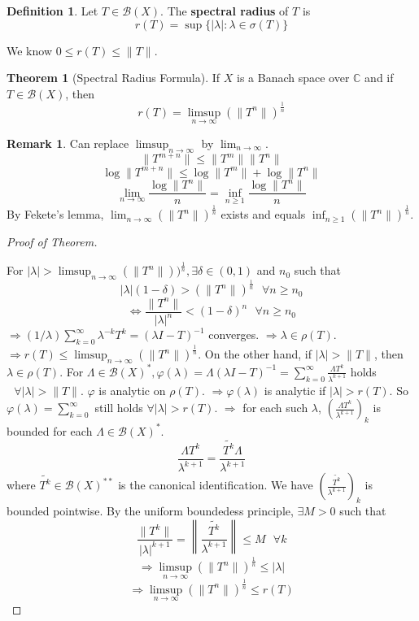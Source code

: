 \documentclass{article}
\theoremstyle{definition}
\newtheorem{thm}{Theorem}
\newtheorem{dfn}{Definition}
\newtheorem{rem}{Remark}
\newenvironment{proofs}[1][\proofname]{%
  \begin{proof}[#1]$ $\par\nobreak\ignorespaces
}{%
  \end{proof}
}
\newcommand{\sfa}{\text{  } \forall}
\begin{document}
\begin{dfn}
	Let $T \in \mathcal{B}(X)$.
	The \textbf{spectral radius} of $T$ is 
	\[
		r(T) = \sup \{|\lambda|: \lambda \in \sigma(T)\}
	\]
\end{dfn}

We know $0 \leq r(T) \leq \|T\|$.

\begin{thm}[Spectral Radius Formula]
	If $X$ is a Banach space over $\mathbb{C}$ and if $T \in \mathcal{B}(X)$, then
	\[
		r(T) = \limsup_{n \to \infty} (\|T^n\|)^{\frac{1}{n}}
	\]
\end{thm}

\begin{rem}
	Can replace $\limsup_{n \to \infty}$ by $\lim_{n \to \infty}$.
	\[
		\|T^{m + n} \| \leq \| T^m\|\|T^n\|
	\]
	\[
		\log \|T^{m + n}\| \leq \log \|T^m\| + \log \|T^n\|
	\]
	\[
		\lim_{n \to \infty} \frac{\log \|T^n\|}{n} = \inf_{n \geq 1} \frac{\log \|T^n\|}{n}
	\]
	By Fekete's lemma, $\lim_{n \to \infty}(\|T^n\|)^{\frac{1}{n}}$ exists and equals $\inf_{n \geq 1}(\|T^n\|)^{\frac{1}{n}}$.
\end{rem}

\begin{proofs}[Proof of Theorem]
	For $|\lambda| > \limsup_{n \to \infty} (\|T^n\|))^\frac{1}{n}, \exists \delta \in (0, 1)$ and $n_0$ such that
	\[
		|\lambda|(1 - \delta) > (\|T^n\|)^{\frac{1}{n}} \sfa n \geq n_0
	\]
	\[
		\Leftrightarrow \frac{\|T^n\|}{|\lambda|^n} < (1 - \delta)^n \sfa n \geq n_0
	\]
	$\Rightarrow (1/\lambda) \sum_{k = 0}^\infty \lambda^{-k} T^k = (\lambda I - T)^{-1}$ converges.
	$\Rightarrow \lambda \in \rho(T)$.
	$\Rightarrow r(T) \leq \limsup_{n \to \infty} (\|T^n\|)^{\frac{1}{n}}$.
	On the other hand, if $|\lambda| > \|T\|$, then $\lambda \in \rho(T)$.
	For $\Lambda \in \mathcal{B}(X)^*, \varphi(\lambda) = \Lambda(\lambda I - T)^{-1} = \sum_{k = 0}^\infty \frac{\Lambda T^k}{\lambda^{k + 1}}$ holds $\sfa |\lambda| > \|T\|$.
	$\varphi$ is analytic on $\rho(T)$.
	$\Rightarrow \varphi(\lambda)$ is analytic if $|\lambda| > r(T)$.
	So $\varphi(\lambda) = \sum_{k = 0}^\infty$ still holds $\forall |\lambda| > r(T)$.
	$\Rightarrow$ for each such $\lambda$, $\left(\frac{\Lambda T^k}{\lambda^{k + 1}} \right)_k$ is bounded for each $\Lambda \in \mathcal{B}(X)^*$.
	\[
		\frac{\Lambda T^k}{\lambda^{k + 1}} = \frac{\tilde{T^k} \Lambda}{\lambda^{k + 1}}
	\]
	where $\tilde{T^k} \in \mathcal{B}(X)^{**}$ is the canonical identification.
	We have $\left( \frac{\tilde{T^k}}{\lambda^{k + 1}} \right)_k$ is bounded pointwise.
	By the uniform boundedess principle, $\exists M > 0$ such that 
	\[
		\frac{\|T^k\|}{|\lambda|^{k + 1}} = \left\|\frac{\tilde{T^k}}{\lambda^{k + 1}} \right\| \leq M \sfa k
	\]
	\[
		\Rightarrow \limsup_{n \to \infty} (\|T^n\|)^{\frac{1}{n}} \leq |\lambda|
	\]
	\[
		\Rightarrow \limsup_{n \to \infty} (\|T^n\|)^{\frac{1}{n}} \leq r(T)
	\]
\end{proofs}
\end{document}
